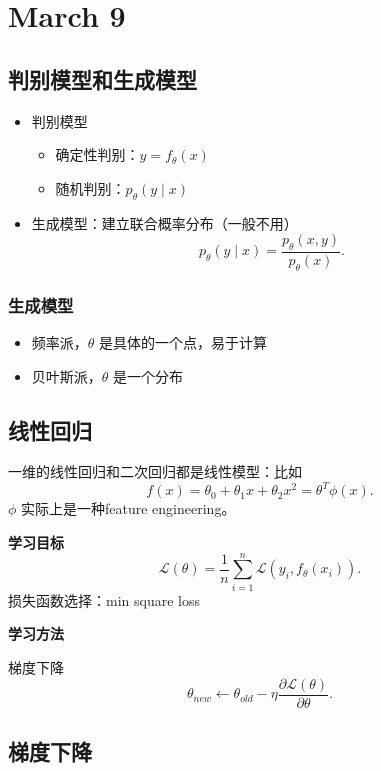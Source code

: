 
\chapter{March 9}
\section{判别模型和生成模型}
\begin{itemize}
		\item 判别模型
				\begin{itemize}
						\item 确定性判别：$y=f_{\theta}\left( x \right) $
						\item 随机判别：$p_{\theta}\left( y \mid x \right) $
				\end{itemize}
		\item 生成模型：建立联合概率分布（一般不用）
				\[
						p_{\theta}\left( y \mid x \right) = \frac{p_{\theta}\left( x,y \right)}{p_{\theta}\left( x \right)  }
				.\] 
\end{itemize}

\subsection{生成模型}
\begin{itemize}
		\item 频率派，$\theta$ 是具体的一个点，易于计算
		\item 贝叶斯派，$\theta$ 是一个分布
\end{itemize}


\section{线性回归}
一维的线性回归和二次回归都是线性模型：比如
\[
		f\left( x \right) =\theta_0+\theta_1x+\theta_2 x^2 = \theta^{T} \phi\left( x \right) 
.\] 
$\phi$ 实际上是一种feature engineering。


\noindent \textbf{学习目标} 
\[
		\mathcal{L}\left( \theta \right)  = 
		\frac{1}{n} \sum_{i=1}^{n} \mathcal{L}\left( y_{i},f_{\theta}\left( x_{i} \right)  \right) 
.\] 
损失函数选择：min square loss

\noindent \textbf{学习方法}

梯度下降
\[
		\theta_{new} \leftarrow \theta_{old} - \eta \frac{\partial \mathcal{L}\left( \theta \right) }{\partial \theta} 
.\] 

\section{梯度下降}
